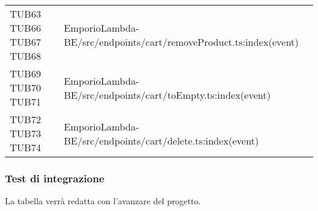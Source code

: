 {\begin{longtable}{C{2cm} C{12.8cm}}
TUB63 \newline TUB66 \newline TUB67 \newline TUB68 & EmporioLambda-BE/src/endpoints/cart/removeProduct.ts:index(event)\\

TUB69 \newline TUB70 \newline TUB71 & EmporioLambda-BE/src/endpoints/cart/toEmpty.ts:index(event)\\

TUB72 \newline TUB73 \newline TUB74 & EmporioLambda-BE/src/endpoints/cart/delete.ts:index(event)\\




\end{longtable}

}

\subsubsection{Test di integrazione}
La tabella verrà redatta con l'avanzare del progetto.

